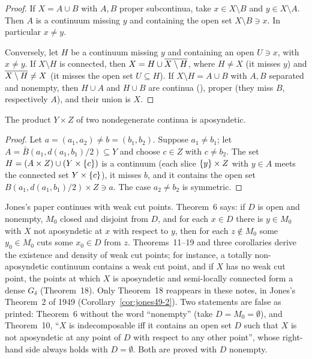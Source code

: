 \begin{proof}
If $X=A\cup B$ with $A,B$ proper subcontinua, take $x\in X\setminus B$ and $y\in X\setminus A$. Then $A$ is a
continuum missing $y$ and containing the open set $X\setminus B\ni x$. In particular $x\ne y$.

Conversely, let $H$ be a continuum missing $y$ and containing an open $U\ni x$, with $x\ne y$. If $X\setminus H$ is
connected, then $X=H\cup\overline{X\setminus H}$, where $H\ne X$ (it misses $y$) and $\overline{X\setminus H}\neq X$ (it misses
the open set $U\subseteq H$). If $X\setminus H=A\cup B$ with $A,B$ separated and nonempty, then $H\cup A$ and $H\cup B$
are continua (), proper (they miss $B$, respectively $A$), and their union is $X$.
\end{proof}


\begin{theorem}\label{thm:jones48-7}
The product $Y\times Z$ of two nondegenerate continua is aposyndetic.
\end{theorem}

\begin{proof}
Let $a=(a_1,a_2)\ne b=(b_1,b_2)$. Suppose $a_1\ne b_1$; let $A=\bar B(a_1,d(a_1,b_1)/2)\subseteq Y$ and choose
$c\in Z$ with $c\ne b_2$. The set $H=(A\times Z)\cup(Y\times\left\{ c \right\})$ is a continuum (each slice $\left\{ y \right\}\times
Z$ with $y\in A$ meets the connected set $Y\times\left\{ c \right\}$), it misses $b$, and it contains the open set
$B(a_1,d(a_1,b_1)/2)\times Z\ni a$. The case $a_2\ne b_2$ is symmetric.
\end{proof}


\begin{remark}\label{rem:jones48-rest}
Jones's paper continues with weak cut points. Theorem~6 says: if $D$ is open and nonempty, $M_0$ closed and
disjoint from $D$, and for each $x\in D$ there is $y\in M_0$ with $X$ not aposyndetic at $x$ with respect to $y$,
then for each $z\notin M_0$ some $y_0\in M_0$ cuts some $x_0\in D$ from $z$. Theorems~11--19 and three corollaries
derive the existence and density of weak cut points; for instance, a totally non-aposyndetic continuum
contains a weak cut point, and if $X$ has no weak cut point, the points at which $X$ is aposyndetic and
semi-locally connected form a dense $G_\delta$ (Theorem~18). Only Theorem~18 reappears in these notes, in
Jones's Theorem~2 of 1949 (Corollary~\ref{cor:jones49-2}). Two statements are false as printed: Theorem~6
without the word ``nonempty'' (take $D=M_0=\emptyset$), and Theorem~10, ``$X$ is indecomposable iff it contains
an open set $D$ such that $X$ is not aposyndetic at any point of $D$ with respect to any other point'', whose
right-hand side always holds with $D=\emptyset$. Both are proved with $D$ nonempty.
\end{remark}

